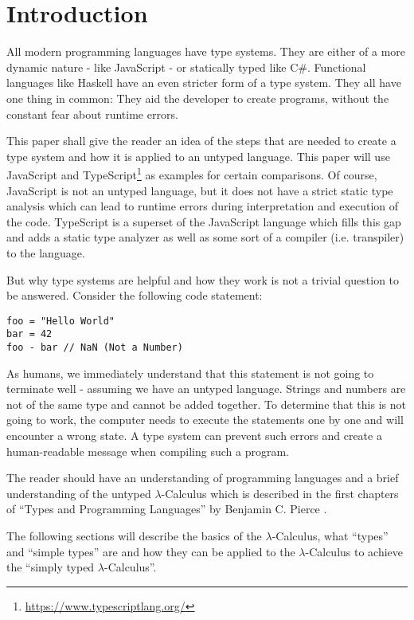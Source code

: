 \section{Introduction}


All modern programming languages have type systems.
They are either of a more dynamic nature - like JavaScript -
or statically typed like C\#. Functional languages like Haskell have
an even stricter form of a type system. They all have one thing in
common: They aid the developer to create programs, without the
constant fear about runtime errors.

This paper shall give the reader an idea of the steps that
are needed to create a type system and how it is applied to
an untyped language. This paper will use JavaScript and TypeScript\footnote{\url{https://www.typescriptlang.org/}}
as examples for certain comparisons.
Of course, JavaScript is not an untyped language, but
it does not have a strict static type analysis which can lead
to runtime errors during interpretation and execution of the code.
TypeScript is a superset of the JavaScript language which fills this
gap and adds a static type analyzer as well as some sort of a compiler
(i.e. transpiler) to the language.

But why type systems are helpful and how they work
is not a trivial question to be answered. Consider
the following code statement:

\begin{lstlisting}[style=JavaScript, caption={Runtime error}, captionpos=b]
foo = "Hello World"
bar = 42
foo - bar // NaN (Not a Number)
\end{lstlisting}

As humans, we immediately understand that this statement
is not going to terminate well - assuming we have an untyped
language. Strings and numbers are not
of the same type and cannot be added together. To determine
that this is not going to work, the computer needs to execute
the statements one by one and will encounter a wrong state.
A type system can prevent such errors and create a
human-readable message when compiling such a program.

The reader should have an understanding of programming
languages and a brief understanding of the untyped
$\lambda$-Calculus which is described in the first
chapters of ``Types and Programming Languages'' by
Benjamin C. Pierce \cite{pierce2002ProgLang}.

The following sections will describe the basics of the
$\lambda$-Calculus, what ``types'' and ``simple types'' are
and how they can be applied to the $\lambda$-Calculus to
achieve the ``simply typed $\lambda$-Calculus''.
